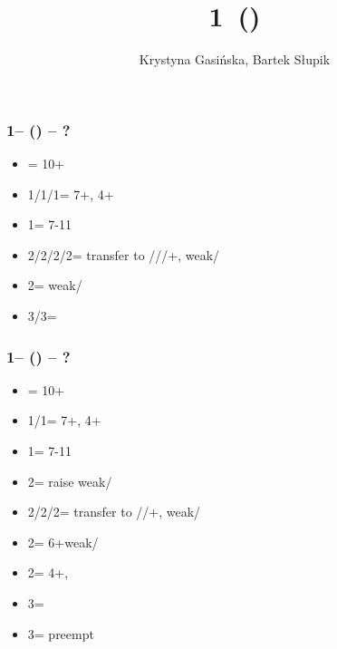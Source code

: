 \documentclass[12pt, a4paper]{article}
\title{1\minor\ (\dbl)}
\author{Krystyna Gasińska, Bartek Słupik}
\begin{document}
\maketitle


\subsubsection*{1\clubs -- (\dbl) -- ?}
\begin{itemize}
    \item \rdbl = 10+
    \item 1\diams/1\hearts/1\spades = 7+\hcp, 4+
    \item 1\nt = 7-11
    \item 2\clubs/2\diams/2\hearts/2\spades = transfer to \diams/\hearts/\spades/+, weak/\gf
    \item 2\nt = \minor weak/\gf
    \item 3\clubs/3\diams = \inv
\end{itemize}

\subsubsection*{1\diams -- (\dbl) -- ?}
\begin{itemize}
    \item \rdbl = 10+
    \item 1\hearts/1\spades = 7+\hcp, 4+
    \item 1\nt = 7-11
    \item 2\clubs = \diams raise weak/\gf
    \item 2\diams/2\hearts/2\spades = transfer to \hearts/\spades/+, weak/\gf
    \item 2\spades = 6+\clubs weak/\gf
    \item 2\nt = 4+\diams, \invp
    \item 3\clubs = \inv
    \item 3\diams = preempt
\end{itemize}

\end{document}
